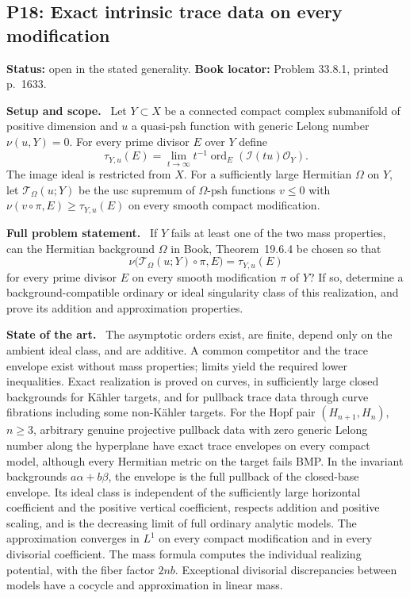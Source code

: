 \documentclass[11pt]{article}
\newcommand{\field}[1]{\par\medskip\noindent\textbf{#1.}\ }
\begin{document}
\subsection{P18: Exact intrinsic trace data on every modification}
\label{P18}
\noindent\textbf{Status:} open in the stated generality. \textbf{Book locator:} Problem 33.8.1, printed p.~1633.
\field{Setup and scope} Let $Y\subset X$ be a connected compact complex submanifold of positive dimension and $u$ a quasi-psh function with generic Lelong number $\nu(u,Y)=0$. For every prime divisor $E$ over $Y$ define
\[\tau_{Y,u}(E)=\lim_{t\to\infty}t^{-1}\operatorname{ord}_E(\mathcal I(tu)\mathcal O_Y).\]
The image ideal is restricted from $X$. For a sufficiently large Hermitian $\Omega$ on $Y$, let $\mathcal T_\Omega(u;Y)$ be the usc supremum of $\Omega$-psh functions $v\leq0$ with $\nu(v\circ\pi,E)\geq\tau_{Y,u}(E)$ on every smooth compact modification.
\field{Full problem statement} If $Y$ fails at least one of the two mass properties, can the Hermitian background $\Omega$ in Book, Theorem~19.6.4 be chosen so that
\[
 \nu\bigl(\mathcal T_\Omega(u;Y)\circ\pi,E\bigr)
       =\tau_{Y,u}(E)
\]
for every prime divisor $E$ on every smooth modification $\pi$ of $Y$? If so, determine a background-compatible ordinary or ideal singularity class of this realization, and prove its addition and approximation properties.
\field{State of the art} The asymptotic orders exist, are finite, depend only on the ambient ideal class, and are additive. A common competitor and the trace envelope exist without mass properties; limits yield the required lower inequalities. Exact realization is proved on curves, in sufficiently large closed backgrounds for K\"ahler targets, and for pullback trace data through curve fibrations including some non-K\"ahler targets. For the Hopf pair $(H_{n+1},H_n)$, $n\geq3$, arbitrary genuine projective pullback data with zero generic Lelong number along the hyperplane have exact trace envelopes on every compact model, although every Hermitian metric on the target fails BMP. In the invariant backgrounds $a\alpha+b\beta$, the envelope is the full pullback of the closed-base envelope. Its ideal class is independent of the sufficiently large horizontal coefficient and the positive vertical coefficient, respects addition and positive scaling, and is the decreasing limit of full ordinary analytic models. The approximation converges in $L^1$ on every compact modification and in every divisorial coefficient. The mass formula computes the individual realizing potential, with the fiber factor $2nb$. Exceptional divisorial discrepancies between models have a cocycle and approximation in linear mass.
\end{document}
